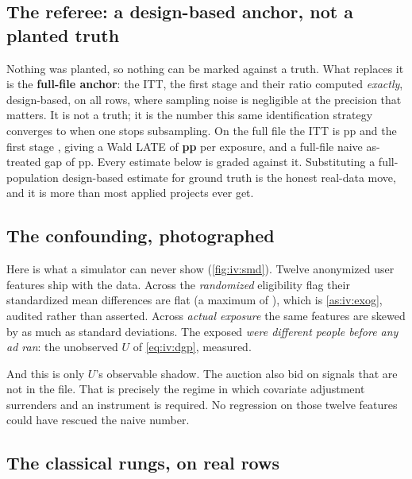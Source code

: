 \subsection*{The referee: a design-based anchor, not a planted truth}

Nothing was planted, so nothing can be marked against a truth. What replaces it is the
\textbf{full-file anchor}: the ITT, the first stage and their ratio computed \emph{exactly},
design-based, on all \nbElevenBNFull{} rows, where sampling noise is negligible at the precision
that matters. It is not a truth; it is the number this same identification strategy converges to
when one stops subsampling. On the full file the ITT is \nbElevenBAnchorItt{} pp and the first stage
\nbElevenBAnchorFirst, giving a Wald LATE of \textbf{\nbElevenBAnchorWald{} pp} per exposure, and
a full-file naive as-treated gap of \nbElevenBAnchorNaive{} pp. Every estimate below is graded
against it. Substituting a full-population design-based estimate for ground truth is the honest
real-data move, and it is more than most applied projects ever get.

\subsection*{The confounding, photographed}

Here is what a simulator can never show (\cref{fig:iv:smd}). Twelve anonymized user features ship
with the data. Across the \emph{randomized} eligibility flag their standardized mean differences are
flat (a maximum of \nbElevenBSmdZMax{}), which is \cref{as:iv:exog}, audited rather than
asserted. Across \emph{actual exposure} the same features are skewed by as much as
\nbElevenBSmdDMax{} standard deviations. The exposed \emph{were different people before any ad
ran}: the unobserved $U$ of \cref{eq:iv:dgp}, measured.



And this is only $U$'s observable shadow. The auction also bid on signals that are not in the file.
That is precisely the regime in which covariate adjustment surrenders and an instrument is
required. No regression on those twelve features could have rescued the naive number.

\subsection*{The classical rungs, on real rows}




